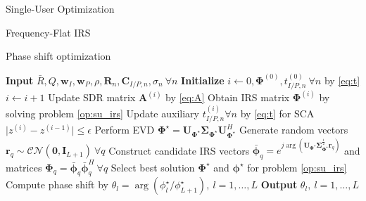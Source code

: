\documentclass{IEEEtran}
\begin{document}
\begin{section}{Single-User Optimization}
\begin{subsection}{Frequency-Flat IRS}
\begin{subsubsection}{Phase shift optimization}
\begin{algorithm}
				\begin{algorithmic}[1]
					\State \textbf{Input} $\bar{R},Q,\boldsymbol{w}_I,\boldsymbol{w}_P,\rho,\boldsymbol{R}_n,\boldsymbol{C}_{I/P,n},\sigma_n \ \forall n$
					\State \textbf{Initialize} $i \leftarrow 0,\boldsymbol{\Phi}^{(0)},t_{I/P,n}^{(0)}\ \forall n$ by \ref{eq:t}
					\Repeat
					\State $i \leftarrow i + 1$
					\State Update SDR matrix $\boldsymbol{A}^{(i)}$ by \ref{eq:A}
					\State Obtain IRS matrix $\boldsymbol{\Phi}^{(i)}$ by solving problem \ref{op:su_irs}
					\State Update auxiliary $t_{I/P,n}^{(i)} \forall n$ by \ref{eq:t} for SCA
					\Until $\lvert z^{(i)}-z^{(i-1)} \rvert \le \epsilon$
					\State Perform EVD $\boldsymbol{\Phi}^{\star}=\boldsymbol{U}_{\boldsymbol{\Phi}^{\star}}\boldsymbol{\Sigma}_{\boldsymbol{\Phi}^{\star}}\boldsymbol{U}_{\boldsymbol{\Phi}^{\star}}^H$
					\State Generate random vectors $\boldsymbol{r}_q \sim \mathcal{CN}(\boldsymbol{0},\boldsymbol{I}_{L+1}) \ \forall q$
					\State Construct candidate IRS vectors $\bar{\boldsymbol{\phi}}_q=e^{j\arg\left(\boldsymbol{U}_{\boldsymbol{\Phi}^{\star}}\boldsymbol{\Sigma}_{\boldsymbol{\Phi}^{\star}}^{\frac{1}{2}}\boldsymbol{r}_q\right)}$ and matrices $\boldsymbol{\Phi}_q=\bar{\boldsymbol{\phi}}_q\bar{\boldsymbol{\phi}}_q^H  \ \forall q$
					\State Select best solution $\boldsymbol{\Phi}^\star$ and $\boldsymbol{\phi}^\star$ for problem \ref{op:su_irs}
					\State Compute phase shift by $\theta_l=\arg(\phi_l^\star/\phi_{L+1}^\star), \ l=1,\dots,L$
					\State \textbf{Output} $\theta_l, \ l=1,\dots,L$
				\end{algorithmic}
			\end{algorithm}
		\end{subsubsection}


\end{subsection}
\end{section}
\end{document}
